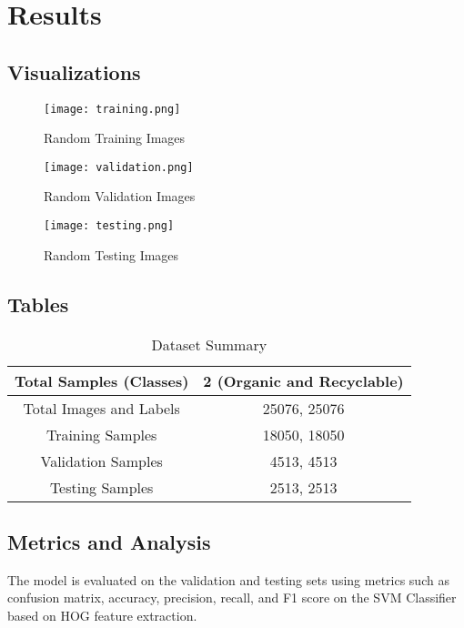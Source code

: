 \documentclass{article}
\begin{document}
\section{Results}

\subsection{Visualizations}

\begin{figure}[H]
  \centering
  \texttt{[image: training.png]}
  \caption{Random Training Images}
  \label{fig:training_images}
\end{figure}

\begin{figure}[H]
  \centering
  \texttt{[image: validation.png]}
  \caption{Random Validation Images}
  \label{fig:validation_images}
\end{figure}

\begin{figure}[H]
  \centering
  \texttt{[image: testing.png]}
  \caption{Random Testing Images}
  \label{fig:testing_images}
\end{figure}

\subsection{Tables}

\begin{table}[H]
  \centering
  \begin{tabular}{|c|c|}
    \hline
    Total Samples (Classes) & 2 (Organic and Recyclable) \\
    \hline
    Total Images and Labels & 25076, 25076 \\
    \hline
    Training Samples & 18050, 18050 \\
    \hline
    Validation Samples & 4513, 4513 \\
    \hline
    Testing Samples & 2513, 2513 \\
    \hline
  \end{tabular}
  \caption{Dataset Summary}
  \label{tab:dataset_summary}
\end{table}

\subsection{Metrics and Analysis}
The model is evaluated on the validation and testing sets using metrics such as confusion matrix, accuracy, precision, recall, and F1 score on the SVM Classifier based on HOG feature extraction.
\end{document}
